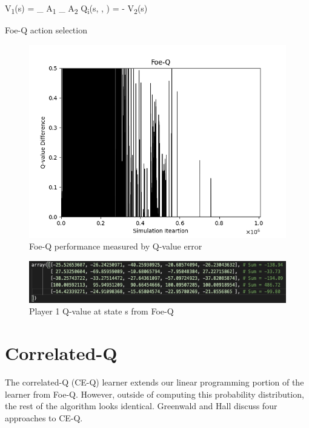 \documentclass[conference]{IEEEtran}
\begin{document}
\begin{algorithm}
    \label{alg:foe-q}
    V\textsubscript{1}(s) = \max_{ \in A\textsubscript{1}} \max_{ \in A\textsubscript{2}} Q\textsubscript{i}(s, , ) = - V\textsubscript{2}(s)
    \caption{Foe-Q action selection}
\end{algorithm}

\begin{figure}[]
    \centering
    \includegraphics[scale=0.45]{figs/Foe-Q}
    \caption{Foe-Q performance measured by Q-value error}
    \label{fig:foe-q}
\end{figure}

\begin{figure}[]
    \centering
    \includegraphics[scale=0.42]{figs/foe-q-values}
    \caption{Player 1 Q-value at state s from Foe-Q}
    \label{fig:foe-q-values}
\end{figure}

\section{Correlated-Q}
The correlated-Q (CE-Q) learner extends our linear programming portion of the learner from Foe-Q. However, outside of computing this probability distribution, the rest of the algorithm looks identical. Greenwald and Hall discuss four approaches to CE-Q.
\end{document}
